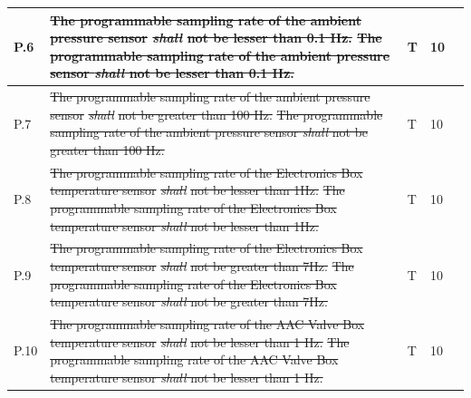 \documentclass[a4paper,12pt,twoside]{article}
\providecommand{\DIFaddtex}[1]{{\protect\color{blue}\uwave{#1}}} %
\providecommand{\DIFdeltex}[1]{{\protect\color{red}\sout{#1}}}                      %
\providecommand{\DIFaddbegin}{} %
\providecommand{\DIFaddend}{} %
\providecommand{\DIFdelbegin}{} %
\providecommand{\DIFdelend}{} %
\providecommand{\DIFadd}[1]{\texorpdfstring{\DIFaddtex{#1}}{#1}} %
\providecommand{\DIFdel}[1]{\texorpdfstring{\DIFdeltex{#1}}{}} %
\newcommand{\DIFscaledelfig}{0.5}
\newlength{\DIFdelgraphicswidth} %
\newlength{\DIFdelgraphicsheight} %
\newcommand{\DIFaddincludegraphics}[2][]{{\color{blue}\fbox{\DIFOincludegraphics[#1]{#2}}}} %
\newcommand{\DIFdelincludegraphics}[2][]{%
\sbox{\DIFdelgraphicsbox}{\DIFOincludegraphics[#1]{#2}}%
\settoboxwidth{\DIFdelgraphicswidth}{\DIFdelgraphicsbox} %
\settoboxtotalheight{\DIFdelgraphicsheight}{\DIFdelgraphicsbox} %
\scalebox{\DIFscaledelfig}{%
\parbox[b]{\DIFdelgraphicswidth}{\usebox{\DIFdelgraphicsbox}\\[-\baselineskip] \rule{\DIFdelgraphicswidth}{0em}}\llap{\resizebox{\DIFdelgraphicswidth}{\DIFdelgraphicsheight}{%
\setlength{\unitlength}{\DIFdelgraphicswidth}%
\begin{picture}(1,1)%
\thicklines\linethickness{2pt} %
{\color[rgb]{1,0,0}\put(0,0){\framebox(1,1){}}}%
{\color[rgb]{1,0,0}\put(0,0){\line( 1,1){1}}}%
{\color[rgb]{1,0,0}\put(0,1){\line(1,-1){1}}}%
\end{picture}%
}\hspace*{3pt}}} %
} %
\DeclareRobustCommand{\DIFaddbegin}{\DIFOaddbegin \let\includegraphics\DIFaddincludegraphics} %
\DeclareRobustCommand{\DIFaddend}{\DIFOaddend \let\includegraphics\DIFOincludegraphics} %
\DeclareRobustCommand{\DIFdelbegin}{\DIFOdelbegin \let\includegraphics\DIFdelincludegraphics} %
\DeclareRobustCommand{\DIFdelend}{\DIFOaddend \let\includegraphics\DIFOincludegraphics} %
\begin{document}
\begin{longtable}[]{|m{}| m{} |m{} |m{}|m{}|}
P.6  &\DIFdelbegin \DIFdel{The programmable sampling rate of the ambient pressure sensor }\textit{\DIFdel{shall}} %
\DIFdel{not be lesser than 0.1 Hz.                                                                          }\DIFdelend \DIFaddbegin \st{ The programmable sampling rate of the ambient pressure sensor \textit{shall} not be lesser than 0.1 Hz.}\DIFadd{\textsuperscript{\ref{replaceSoftVeri}}                                                                          }\DIFaddend &      T        & 10            &        \\ \hline
P.7  & \DIFdelbegin \DIFdel{The programmable sampling rate of the ambient pressure sensor }\textit{\DIFdel{shall}} %
\DIFdel{not be greater than 100 Hz.                                                                         }\DIFdelend \DIFaddbegin \st{The programmable sampling rate of the ambient pressure sensor \textit{shall} not be greater than 100 Hz.}\DIFadd{\textsuperscript{\ref{replaceSoftVeri}}                                                                         }\DIFaddend &       T       & 10            &        \\ \hline
P.8  & \DIFdelbegin \DIFdel{The programmable sampling rate of the Electronics Box temperature sensor }\textit{\DIFdel{shall}} %
\DIFdel{not be lesser than 1Hz.                                                                          }\DIFdelend \DIFaddbegin \st{The programmable sampling rate of the Electronics Box temperature sensor \textit{shall} not be lesser than 1Hz.}\DIFadd{\textsuperscript{\ref{replaceSoftVeri}}                                                                          }\DIFaddend &       T       & 10            &        \\ \hline
P.9  & \DIFdelbegin \DIFdel{The programmable sampling rate of the Electronics Box temperature sensor }\textit{\DIFdel{shall}} %
\DIFdel{not be greater than 7Hz.                                                                         }\DIFdelend \DIFaddbegin \st{The programmable sampling rate of the Electronics Box temperature sensor \textit{shall} not be greater than 7Hz. }\DIFadd{\textsuperscript{\ref{replaceSoftVeri}}                                                                        }\DIFaddend &        T      & 10            &        \\ \hline
P.10 & \DIFdelbegin \DIFdel{The programmable sampling rate of the AAC Valve Box temperature sensor }\textit{\DIFdel{shall}} %
\DIFdel{not be lesser than 1 Hz.                                                                   }\DIFdelend \DIFaddbegin \st{The programmable sampling rate of the AAC Valve Box temperature sensor \textit{shall} not be lesser than 1 Hz. }\DIFadd{\textsuperscript{\ref{replaceSoftVeri}}                                                                  }\DIFaddend &        T      & 10            &        \\ \hline

\end{longtable}
\end{document}
